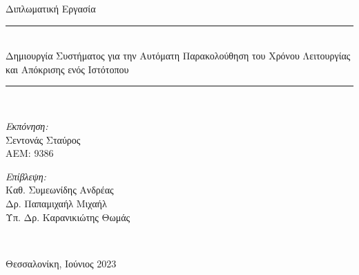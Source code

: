 \begin{titlepage}
  \begin{center}
    \Large Διπλωματική Εργασία \\[0.8cm]

    \rule{450pt}{4pt} \\[0.4cm]
    {\fontsize{20.26pt}{1em}\selectfont Δημιουργία Συστήματος για την Αυτόματη Παρακολούθηση του Χρόνου Λειτουργίας και Απόκρισης ενός Ιστότοπου}

    \rule{350pt}{4pt} \\[4cm]

    \begin{minipage}{0.4\textwidth}
      \begin{flushleft} \normalsize
        \emph{Εκπόνηση:} \\
        Σεντονάς Σταύρος \\
        ΑΕΜ: 9386
      \end{flushleft}
    \end{minipage}
    \begin{minipage}{0.4\textwidth}
      \begin{flushright} \normalsize
        \emph{Επίβλεψη:} \\
        Καθ. Συμεωνίδης Ανδρέας\\
        Δρ. Παπαμιχαήλ Μιχαήλ \\
        Υπ. Δρ. Καρανικιώτης Θωμάς \\
      \end{flushright}
    \end{minipage}
    \\[1cm]
    \vfill

    \large Θεσσαλονίκη, Ιούνιος 2023

  \end{center}
\end{titlepage}
